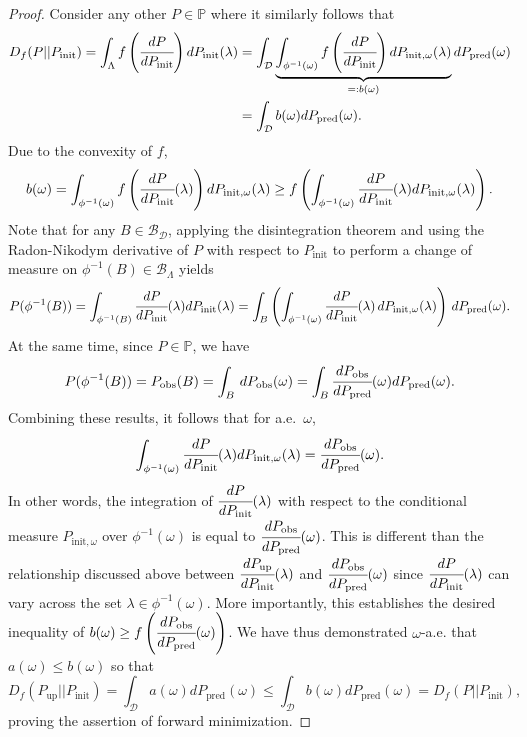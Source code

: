 \documentclass{article}
\newcommand{\p}{\mathbb{P}}
\newcommand{\B}{\mathcal{B}}
\newcommand{\initmeas}{P_{\text{init}}}
\newcommand{\initmeasomega}{P_{\text{init}, \omega}}
\newcommand{\updatemeas}{P_{\text{up}}}
\newcommand{\predictmeas}{P_\text{pred}}
\newcommand{\obsmeas}{P_{\text{obs}}}
\begin{document}
\begin{proof}
Consider any other $P\in\p$ where it similarly follows that
\begin{align}\label{eq:Bint}
  D_{f}(P || \initmeas) =  \int_{\Lambda} f\left(\cfrac{dP}{d\initmeas}\right) d\initmeas(\lambda) &= \int_{\mathcal{D}} \underbrace{\int_{\phi^{-1}(\omega)} f\left(\cfrac{dP}{d\initmeas}\right) d\initmeasomega(\lambda)}_{=: b(\omega)} d\predictmeas(\omega) \\
  &= \int_{\mathcal{D}} b(\omega) d\predictmeas(\omega). \nonumber 
\end{align}
Due to the convexity of $f$,
\begin{equation*}
    b(\omega) = \int_{\phi^{-1}(\omega)} f\left(\cfrac{dP}{d\initmeas}(\lambda)\right) d\initmeasomega(\lambda) \ge f\left(\int_{\phi^{-1}(\omega)} \cfrac{dP}{d\initmeas}(\lambda) d\initmeasomega(\lambda)\right).
\end{equation*}
Note that for any $B \in \mathcal{B}_{\mathcal{D}}$, applying the disintegration theorem and using the Radon-Nikodym derivative of $P$ with respect to $P_\text{init}$ to perform a change of measure on $\phi^{-1}(B)\in\B_\Lambda$ yields
\begin{equation*}
    P(\phi^{-1}(B)) = \int_{\phi^{-1}(B)} \cfrac{dP}{d\initmeas}(\lambda) d\initmeas(\lambda) = \int_{B} \left( \int_{\phi^{-1}(\omega)} \cfrac{dP}{d\initmeas}(\lambda) \, d\initmeasomega(\lambda) \right) \, d\predictmeas(\omega).
\end{equation*}
At the same time, since $P\in\p$, we have
\begin{equation*}
    P(\phi^{-1}(B)) = \obsmeas(B) = \int_B \, d\obsmeas(\omega) = \int_{B} \cfrac{d\obsmeas}{d\predictmeas}(\omega) d\predictmeas(\omega).
\end{equation*}
Combining these results, it follows that for a.e.~$\omega$, 
\begin{equation*}
    \int_{\phi^{-1}(\omega)} \cfrac{dP}{d\initmeas}(\lambda) d\initmeasomega(\lambda) = \cfrac{d\obsmeas}{d\predictmeas}(\omega).
\end{equation*}
In other words, the integration of $\cfrac{dP}{dP_\text{init}}(\lambda)$ with respect to the conditional measure $\initmeasomega$ over $\phi^{-1}(\omega)$ is equal to $\cfrac{d\obsmeas}{d\predictmeas}(\omega)$.
This is different than the relationship discussed above between $\cfrac{d\updatemeas}{dP_\text{init}}(\lambda)$ and $\cfrac{d\obsmeas}{d\predictmeas}(\omega)$ since $\cfrac{dP}{dP_\text{init}}(\lambda)$ can vary across the set $\lambda\in\phi^{-1}(\omega)$.  
More importantly, this establishes the desired inequality of $b(\omega) \geq f\left(\cfrac{d\obsmeas}{d\predictmeas}(\omega)\right)$.
We have thus demonstrated $\omega$-a.e. that $a(\omega) \le b(\omega)$ so  that
\begin{equation*}
 D_{f}(\updatemeas || \initmeas) = \int_{\mathcal{D}} a(\omega) d\predictmeas(\omega)  \le \int_{\mathcal{D}} b(\omega) d\predictmeas(\omega) = D_{f}(P || \initmeas) ,
\end{equation*}
proving the assertion of forward minimization. 


\end{proof}
\end{document}
